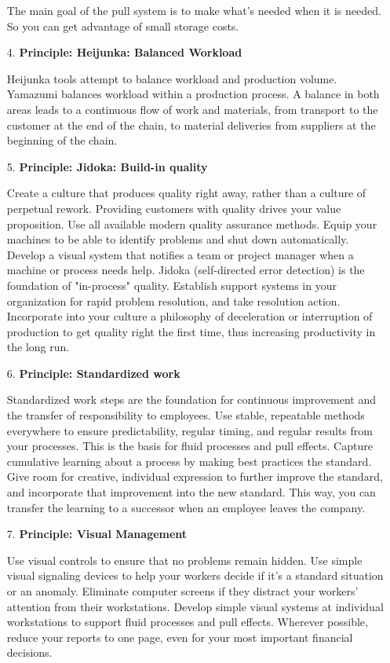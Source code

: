 \documentclass[11pt,a4paper]{article}
\begin{document}
\begin{enumerate}
  The main goal of the pull system is to make what's needed when it is needed.
  So you can get advantage of small storage costs.
    
\item[4.] \textbf{Principle: Heijunka: Balanced Workload}

  Heijunka tools attempt to balance workload and production volume.  Yamazumi
  balances workload within a production process. A balance in both areas leads
  to a continuous flow of work and materials, from transport to the customer
  at the end of the chain, to material deliveries from suppliers at the
  beginning of the chain.

\item[5.] \textbf{Principle: Jidoka: Build-in quality}

  Create a culture that produces quality right away, rather than a culture of
  perpetual rework. Providing customers with quality drives your value
  proposition. Use all available modern quality assurance methods. Equip your
  machines to be able to identify problems and shut down automatically.
  Develop a visual system that notifies a team or project manager when a
  machine or process needs help. Jidoka (self-directed error detection) is the
  foundation of "in-process" quality.  Establish support systems in your
  organization for rapid problem resolution, and take resolution action.
  Incorporate into your culture a philosophy of deceleration or interruption
  of production to get quality right the first time, thus increasing
  productivity in the long run.
\newpage
\item[6.] \textbf{Principle: Standardized work}

  Standardized work steps are the foundation for continuous improvement and
  the transfer of responsibility to employees. Use stable, repeatable methods
  everywhere to ensure predictability, regular timing, and regular results
  from your processes. This is the basis for fluid processes and pull effects.
  Capture cumulative learning about a process by making best practices the
  standard. Give room for creative, individual expression to further improve
  the standard, and incorporate that improvement into the new standard. This
  way, you can transfer the learning to a successor when an employee leaves
  the company.
    
\item[7.] \textbf{Principle: Visual Management}

  Use visual controls to ensure that no problems remain hidden.  Use simple
  visual signaling devices to help your workers decide if it's a standard
  situation or an anomaly. Eliminate computer screens if they distract your
  workers' attention from their workstations.  Develop simple visual systems
  at individual workstations to support fluid processes and pull effects.
  Wherever possible, reduce your reports to one page, even for your most
  important financial decisions.


\end{enumerate}
\end{document}
